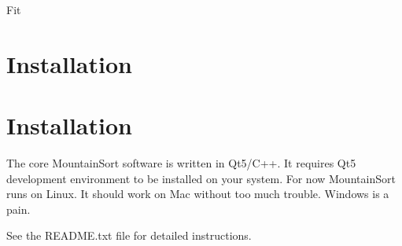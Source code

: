 \documentclass[hidelinks,10pt]{article}
\begin{document}
\begin{algorithm}
\DontPrintSemicolon %

\caption{{\sc Fit}}
\label{algo:fit}
\end{algorithm}


\section {Installation}

\section {Installation}

The core MountainSort software is written in Qt5/C++. It requires Qt5 development environment to be installed on your system. For now MountainSort runs on Linux. It should work on Mac without too much trouble. Windows is a pain.

See the README.txt file for detailed instructions.
\end{document}
